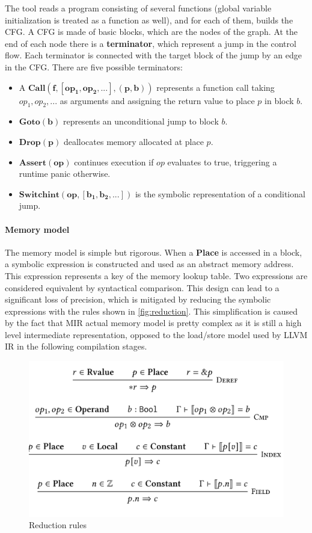 \documentclass{article}
\begin{document}
The tool reads a program consisting of several functions (global variable initialization is treated as a function as well), and for each of them, builds the 
CFG. A CFG is made of basic blocks, which are the nodes of the graph. At the end of each node there is a \textbf{terminator}, which represent a jump  in the control flow. 
Each terminator is connected with the target block of the jump by an edge in the CFG. There  are five possible terminators:
\begin{itemize}
    \item A $\mathbf{Call(f , [op_1, op_2,...], (p, b))}$ represents a function call taking 
    $op_1,op_2,...$ as arguments and assigning the return value to place $p$ in block $b$.
    \item $\mathbf{Goto(b)}$ represents an unconditional jump to block $b$.
    \item $\mathbf{Drop(p)}$ deallocates  memory  allocated at place $p$.
    \item $\mathbf{Assert(op)}$ continues execution if $op$ evaluates to true, triggering a runtime panic otherwise.
    \item $\mathbf{Switchint(op,[ b_1, b_2, ...])}$ is the symbolic representation of a conditional jump.
    

\end{itemize}
\paragraph{Memory model} The memory model is simple but rigorous. When a \textbf{Place} is accessed 
in a block, a symbolic expression is constructed and used as an abstract memory address. This expression represents a key of the memory lookup 
table. Two expressions are considered equivalent by syntactical comparison. This design can lead 
to a significant loss of precision, which is mitigated by reducing the symbolic expressions with the 
rules shown in \autoref{fig:reduction}. This simplification is caused by the fact that MIR actual memory model is pretty complex as it is still 
a high level intermediate representation, opposed to the load/store model used by LLVM IR in the following compilation stages.

\begin{figure}[H]
    \includegraphics[scale=0.3]{red.png}
    \caption{Reduction rules}
    \label{fig:reduction}
\end{figure}
\end{document}
